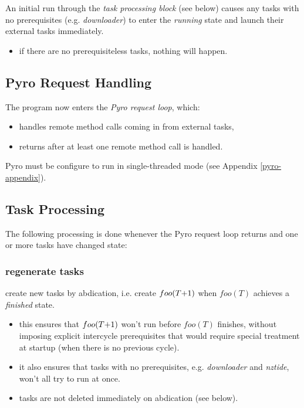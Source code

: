 \documentclass[11pt,a4paper]{report}
\begin{document}
An initial run through the {\em task processing block} (see below)
causes any tasks with no prerequisites (e.g. {\em downloader}) to enter the
{\em running} state and launch their external tasks immediately.
    \begin{itemize}
    \item if there are no prerequisiteless tasks, nothing will happen.
    \end{itemize}


\subsection{Pyro Request Handling}

The program now enters the {\em Pyro request loop}, which:

    \begin{itemize}
    \item handles remote method calls coming in from external tasks, 
    \item returns after at least one remote method call is handled. 
    \end{itemize}

Pyro must be configure to run in single-threaded mode (see Appendix
\ref{pyro-appendix}).

\subsection{Task Processing} 

The following processing is done whenever the Pyro request loop returns
and one or more tasks have changed state: 

\subsubsection{regenerate tasks}

    create new tasks by abdication, i.e.
    create $foo(T\negmedspace +\negmedspace 1)$ when $foo(T)$ achieves a {\em finished} state.
    \begin{itemize}
    \item this ensures that $foo(T\negmedspace +\negmedspace 1)$ won't run before $foo(T)$
    finishes, without imposing explicit intercycle prerequisites
    that would require special treatment at startup (when there is no
    previous cycle). 
    \item it also ensures that tasks with no prerequisites, e.g.
    {\em downloader} and {\em nztide}, won't all try to run at once.
    \item tasks are not deleted immediately on abdication (see below). 
    \end{itemize}
\end{document}
